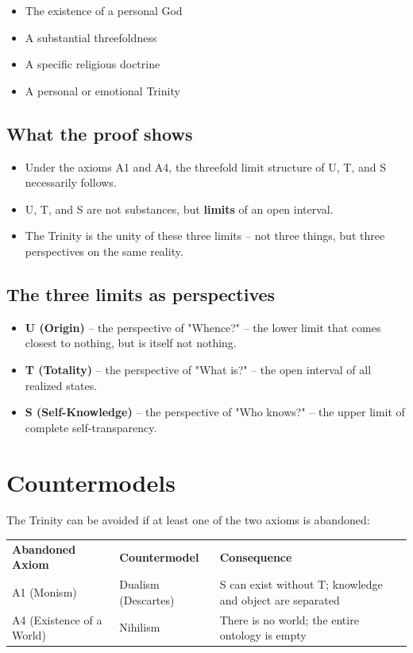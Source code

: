 \documentclass[
]{article}
\begin{document}
\begin{itemize}
\item The existence of a personal God
\item A substantial threefoldness
\item A specific religious doctrine
\item A personal or emotional Trinity
\end{itemize}

\subsection{What the proof shows}\label{what-the-proof-shows}

\begin{itemize}
\item Under the axioms A1 and A4, the threefold limit structure of U, T, and S necessarily follows.
\item U, T, and S are not substances, but \textbf{limits} of an open interval.
\item The Trinity is the unity of these three limits – not three things, but three perspectives on the same reality.
\end{itemize}

\subsection{The three limits as perspectives}\label{the-three-limits-as-perspectives}

\begin{itemize}
\item \textbf{U (Origin)} – the perspective of "Whence?" – the lower limit that comes closest to nothing, but is itself not nothing.
\item \textbf{T (Totality)} – the perspective of "What is?" – the open interval of all realized states.
\item \textbf{S (Self-Knowledge)} – the perspective of "Who knows?" – the upper limit of complete self-transparency.
\end{itemize}

\section{Countermodels}\label{countermodels}

The Trinity can be avoided if at least one of the two axioms is abandoned:

\begin{tabular}{lll}
\textbf{Abandoned Axiom} & \textbf{Countermodel} & \textbf{Consequence} \\
A1 (Monism) & Dualism (Descartes) & S can exist without T; knowledge and object are separated \\
A4 (Existence of a World) & Nihilism & There is no world; the entire ontology is empty \\
\end{tabular}
\end{document}
